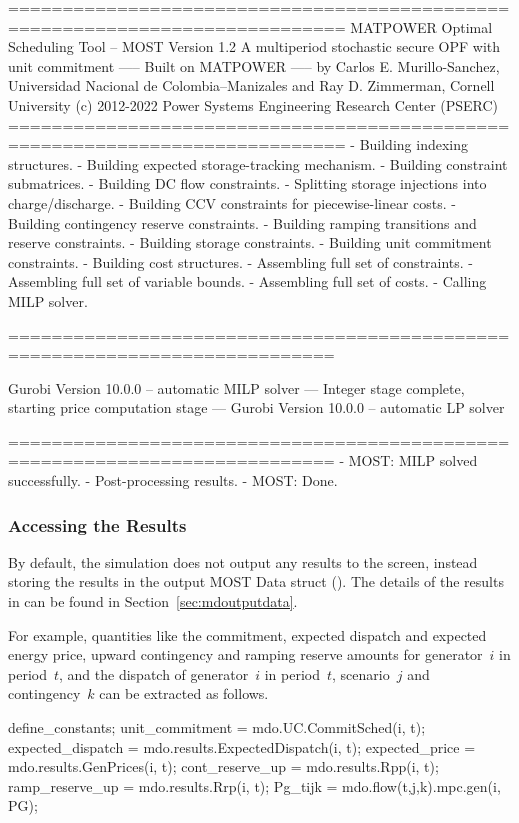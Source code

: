 \documentclass[12pt]{article}
\newcommand{\most}[0]{{MOST}}
\newcommand{\md}[0]{{\most{} Data struct}}
\newcommand{\code}[1]{{\relsize{-0.5}{\tt{{#1}}}}}  %
\numberwithin{equation}{section}
\numberwithin{table}{section}
\numberwithin{figure}{section}
\begin{document}
\begin{Code}
=============================================================================
          MATPOWER Optimal Scheduling Tool  --  MOST Version 1.2
          A multiperiod stochastic secure OPF with unit commitment
                       -----  Built on MATPOWER  -----
  by Carlos E. Murillo-Sanchez, Universidad Nacional de Colombia--Manizales
                  and Ray D. Zimmerman, Cornell University
       (c) 2012-2022 Power Systems Engineering Research Center (PSERC)       
=============================================================================
- Building indexing structures.
- Building expected storage-tracking mechanism.
- Building constraint submatrices.
  - Building DC flow constraints.
  - Splitting storage injections into charge/discharge.
  - Building CCV constraints for piecewise-linear costs.
  - Building contingency reserve constraints.
  - Building ramping transitions and reserve constraints.
  - Building storage constraints.
  - Building unit commitment constraints.
- Building cost structures.
- Assembling full set of constraints.
- Assembling full set of variable bounds.
- Assembling full set of costs.
- Calling MILP solver.

============================================================================

Gurobi Version 10.0.0 -- automatic MILP solver
--- Integer stage complete, starting price computation stage ---
Gurobi Version 10.0.0 -- automatic LP solver

============================================================================
- MOST: MILP solved successfully.
- Post-processing results.
- MOST: Done.
\end{Code}

\subsubsection{Accessing the Results}

By default, the simulation does not output any results to the screen, instead storing the results in the output \md{} (\code{mdo}).
The details of the results in \code{mdo} can be found in Section~\ref{sec:mdoutputdata}.

For example, quantities like the commitment, expected dispatch and expected energy price, upward contingency and ramping reserve amounts for generator~$i$ in period~$t$, and the dispatch of generator~$i$ in period~$t$, scenario~$j$ and contingency~$k$ can be extracted as follows.
\begin{Code}
define_constants;
unit_commitment     = mdo.UC.CommitSched(i, t);
expected_dispatch   = mdo.results.ExpectedDispatch(i, t);
expected_price      = mdo.results.GenPrices(i, t);
cont_reserve_up     = mdo.results.Rpp(i, t);
ramp_reserve_up     = mdo.results.Rrp(i, t);
Pg_tijk             = mdo.flow(t,j,k).mpc.gen(i, PG);
\end{Code}
\end{document}

